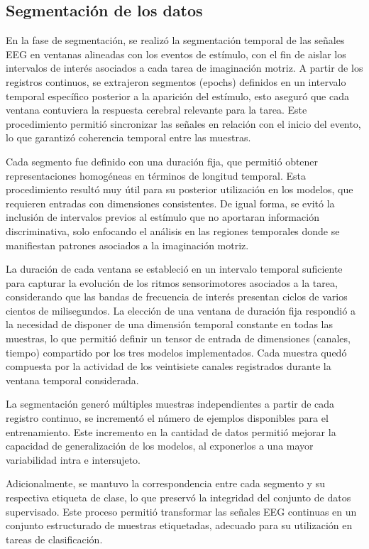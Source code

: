 \subsection{Segmentación de los datos}

En la fase de segmentación, se realizó la segmentación temporal de las señales EEG en ventanas alineadas con los eventos de estímulo, con el fin de aislar los intervalos de interés asociados a cada tarea de imaginación motriz. A partir de los registros continuos, se extrajeron segmentos (epochs) definidos en un intervalo temporal específico posterior a la aparición del estímulo, esto aseguró que cada ventana contuviera la respuesta cerebral relevante para la tarea. Este procedimiento permitió sincronizar las señales en relación con el inicio del evento, lo que garantizó coherencia temporal entre las muestras.

Cada segmento fue definido con una duración fija, que permitió obtener representaciones homogéneas en términos de longitud temporal. Esta procedimiento resultó muy útil para su posterior utilización en los modelos, que requieren entradas con dimensiones consistentes. De igual forma, se evitó la inclusión de intervalos previos al estímulo que no aportaran información discriminativa, solo enfocando el análisis en las regiones temporales donde se manifiestan patrones asociados a la imaginación motriz.

La duración de cada ventana se estableció en un intervalo temporal suficiente para capturar la evolución de los ritmos sensorimotores asociados a la tarea, considerando que las bandas de frecuencia de interés presentan ciclos de varios cientos de milisegundos. La elección de una ventana de duración fija respondió a la necesidad de disponer de una dimensión temporal constante en todas las muestras, lo que permitió definir un tensor de entrada de dimensiones (canales, tiempo) compartido por los tres modelos implementados. Cada muestra quedó compuesta por la actividad de los veintisiete canales registrados durante la ventana temporal considerada.

La segmentación generó múltiples muestras independientes a partir de cada registro continuo, se incrementó el número de ejemplos disponibles para el entrenamiento. Este incremento en la cantidad de datos permitió mejorar la capacidad de generalización de los modelos, al exponerlos a una mayor variabilidad intra e intersujeto.

Adicionalmente, se mantuvo la correspondencia entre cada segmento y su respectiva etiqueta de clase, lo que preservó la integridad del conjunto de datos supervisado. Este proceso permitió transformar las señales EEG continuas en un conjunto estructurado de muestras etiquetadas, adecuado para su utilización en tareas de clasificación.

